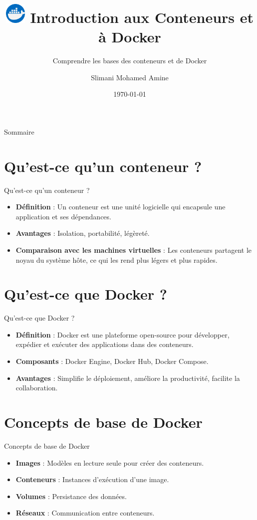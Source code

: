 \documentclass{clbeamer2024}
\title{
	\includegraphics[width=1cm]{logos/docker.png} \hfill
	Introduction aux Conteneurs et à Docker 
}
\subtitle{Comprendre les bases des conteneurs et de Docker}
\author{Slimani Mohamed Amine}
\institute{}
\date{\today}
\begin{document}
	\setcounter{framenumber}{-1}
	\frame{\titlepage}
	
	
	
	\begin{frame}{Sommaire}
		\tableofcontents
	\end{frame}
	

\section{Qu'est-ce qu'un conteneur ?}
\begin{frame}{Qu'est-ce qu'un conteneur ?}
	\begin{itemize}
		\item \textbf{Définition} : Un conteneur est une unité logicielle qui encapsule une application et ses dépendances.
		\item \textbf{Avantages} : Isolation, portabilité, légèreté.
		\item \textbf{Comparaison avec les machines virtuelles} : Les conteneurs partagent le noyau du système hôte, ce qui les rend plus légers et plus rapides.
	\end{itemize}
\end{frame}

\section{Qu'est-ce que Docker ?}
\begin{frame}{Qu'est-ce que Docker ?}
	\begin{itemize}
		\item \textbf{Définition} : Docker est une plateforme open-source pour développer, expédier et exécuter des applications dans des conteneurs.
		\item \textbf{Composants} : Docker Engine, Docker Hub, Docker Compose.
		\item \textbf{Avantages} : Simplifie le déploiement, améliore la productivité, facilite la collaboration.
	\end{itemize}
\end{frame}

\section{Concepts de base de Docker}
\begin{frame}{Concepts de base de Docker}
	\begin{itemize}
		\item \textbf{Images} : Modèles en lecture seule pour créer des conteneurs.
		\item \textbf{Conteneurs} : Instances d'exécution d'une image.
		\item \textbf{Volumes} : Persistance des données.
		\item \textbf{Réseaux} : Communication entre conteneurs.
	\end{itemize}
\end{frame}
\end{document}
